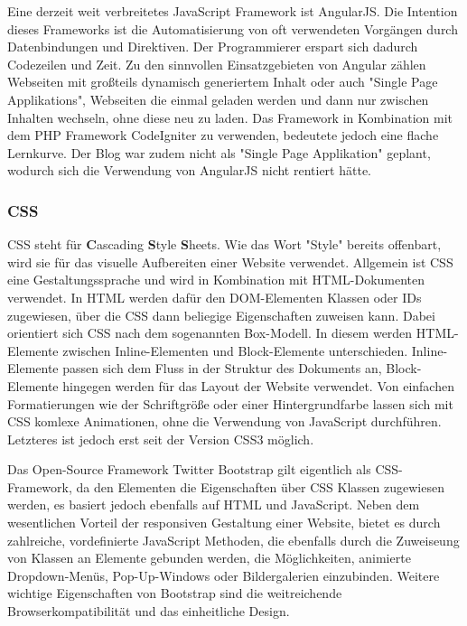       Eine derzeit weit verbreitetes JavaScript Framework ist {AngularJS\cite{angular}}. Die Intention dieses Frameworks ist die Automatisierung von oft verwendeten Vorgängen durch
      Datenbindungen und Direktiven. Der Programmierer erspart sich dadurch Codezeilen und Zeit. Zu den sinnvollen Einsatzgebieten von Angular zählen Webseiten mit großteils dynamisch generiertem
      Inhalt oder auch "Single Page Applikations", Webseiten die einmal geladen werden und dann nur zwischen Inhalten wechseln, ohne diese neu zu laden. Das Framework in Kombination mit dem PHP
      Framework CodeIgniter zu verwenden, bedeutete jedoch eine flache Lernkurve. Der Blog war zudem nicht als "Single Page Applikation" geplant, wodurch sich die Verwendung von AngularJS nicht rentiert hätte.

      \subsubsection*{CSS}
      {CSS\cite{css}} steht für \textbf{C}ascading \textbf{S}tyle \textbf{S}heets. Wie das Wort "Style" bereits offenbart, wird sie für das visuelle Aufbereiten einer Website verwendet.
      Allgemein ist CSS eine Gestaltungssprache und wird in Kombination mit HTML-Dokumenten verwendet. In HTML werden dafür den DOM-Elementen Klassen oder IDs
      zugewiesen, über die CSS dann beliegige Eigenschaften zuweisen kann. Dabei orientiert sich CSS nach dem sogenannten Box-Modell. In diesem werden HTML-Elemente
      zwischen Inline-Elementen und Block-Elemente unterschieden. Inline-Elemente passen sich dem Fluss in der Struktur des Dokuments an, Block-Elemente hingegen
      werden für das Layout der Website verwendet. Von einfachen Formatierungen wie der Schriftgröße oder einer Hintergrundfarbe lassen sich mit CSS komlexe Animationen,
      ohne die Verwendung von JavaScript durchführen. Letzteres ist jedoch erst seit der Version CSS3 möglich.

      Das Open-Source Framework {Twitter Bootstrap\cite{bootstrap}} gilt eigentlich als CSS-Framework, da den Elementen die Eigenschaften über CSS Klassen zugewiesen werden, es basiert jedoch
      ebenfalls auf HTML und JavaScript. Neben dem wesentlichen Vorteil der responsiven Gestaltung einer Website, bietet es durch
      zahlreiche, vordefinierte JavaScript Methoden, die ebenfalls durch die Zuweiseung von Klassen an Elemente gebunden werden, die Möglichkeiten, animierte Dropdown-Menüs, Pop-Up-Windows oder Bildergalerien einzubinden.
      Weitere wichtige Eigenschaften von Bootstrap sind die weitreichende Browserkompatibilität und das einheitliche Design.

